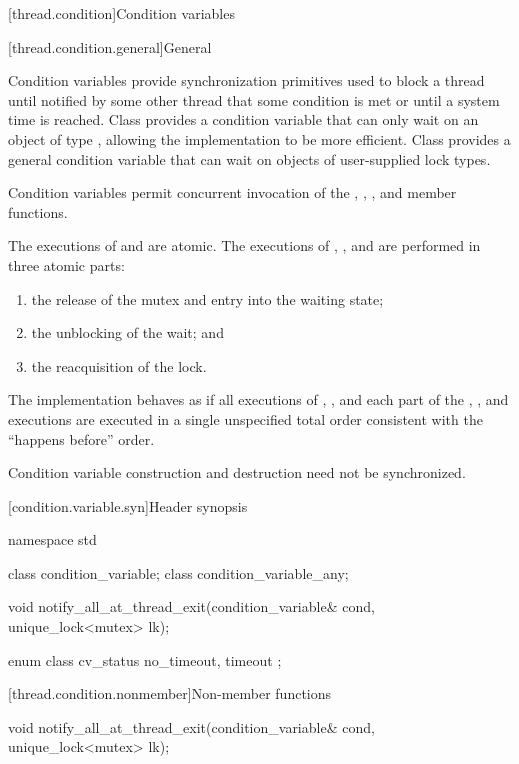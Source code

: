 [thread.condition]{Condition variables}

[thread.condition.general]{General}

\pnum
Condition variables provide synchronization primitives used to block a thread until
notified by some other thread that some condition is met or until a system time is
reached. Class  provides a condition variable that can only
wait on an object of type , allowing the implementation
to be more efficient. Class  provides a general
condition variable that can wait on objects of user-supplied lock types.

\pnum
Condition variables permit concurrent invocation of the , ,
,  and  member functions.

\pnum
The executions of  and 
are atomic.
The executions of , , and  are performed
in three atomic parts:
\begin{enumerate}
\item the release of the mutex and entry into the waiting state;
\item the unblocking of the wait; and
\item the reacquisition of the lock.
\end{enumerate}

\pnum
The implementation behaves as if all executions of , , and each
part of the , , and  executions are
executed in a single unspecified total order consistent with the ``happens before'' order.

\pnum
Condition variable construction and destruction need not be synchronized.

[condition.variable.syn]{Header  synopsis}

%
%
\begin{codeblock}
namespace std {
  class condition_variable;
  class condition_variable_any;

  void notify_all_at_thread_exit(condition_variable& cond, unique_lock<mutex> lk);

  enum class cv_status { no_timeout, timeout };
}
\end{codeblock}

[thread.condition.nonmember]{Non-member functions}
%
\begin{itemdecl}
void notify_all_at_thread_exit(condition_variable& cond, unique_lock<mutex> lk);
\end{itemdecl}

